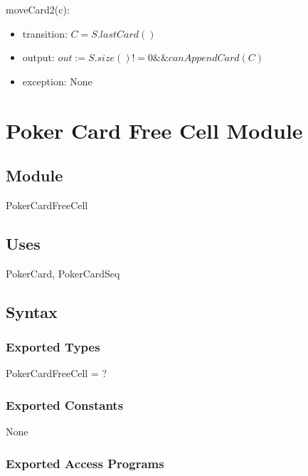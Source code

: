 \documentclass[12pt]{article}
\begin{document}
\noindent moveCard2(c):
\begin{itemize}
\item transition: $C=S.lastCard()$
\item output: $out :=  S.size() != 0 \&\& canAppendCard(C)$
\item exception: None
\end{itemize}


\newpage
\section* {Poker Card Free Cell Module}

\subsection* {Module}

PokerCardFreeCell

\subsection* {Uses}

PokerCard, PokerCardSeq

\subsection* {Syntax}

\subsubsection* {Exported Types}

PokerCardFreeCell = ?

\subsubsection* {Exported Constants}

None

\subsubsection* {Exported Access Programs}
\end{document}
